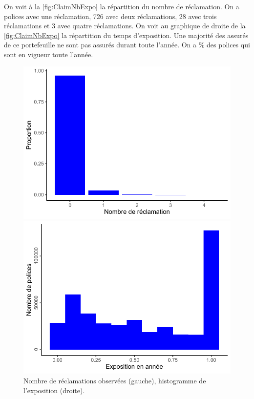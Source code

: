 On voit à la \autoref{fig:ClaimNbExpo} la répartition du nombre de réclamation. On a  polices avec une réclamation, 726 avec deux réclamations, 28 avec trois réclamations et 3 avec quatre réclamations. On voit au graphique de droite de la \autoref{fig:ClaimNbExpo} la répartition du temps d'exposition. Une majorité des assurés de ce portefeuille ne sont pas assurés durant toute l'année. On a \% des polices qui sont en vigueur toute l'année. 



\begin{figure}[b]
\caption{\label{fig:ClaimNbExpo} Nombre de réclamations observées (gauche), histogramme de l'exposition (droite).}
\centering
\begin{minipage}{0.4\linewidth}
\includegraphics[scale=0.5]{Graphiques/BarplotClaimNb}
\end{minipage}
\hfill
\begin{minipage}{0.4\linewidth}
\includegraphics[scale=0.5]{Graphiques/RepartExposure}
\end{minipage}
\end{figure}

